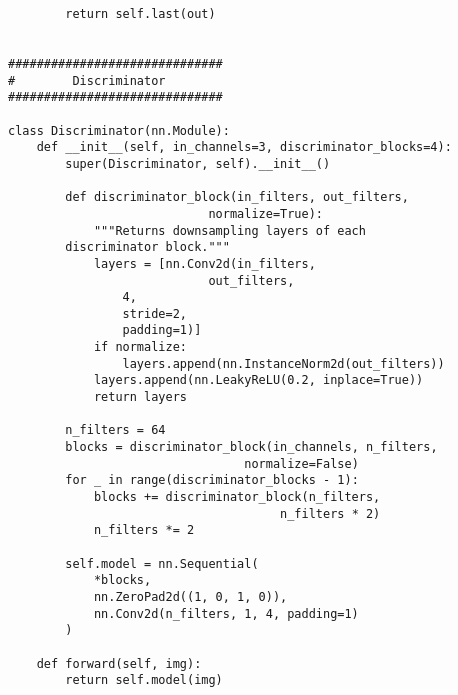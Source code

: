 \documentclass[../main.tex]{subfiles}
\begin{document}
\begin{lstlisting}
        return self.last(out)


##############################
#        Discriminator
##############################

class Discriminator(nn.Module):
    def __init__(self, in_channels=3, discriminator_blocks=4):
        super(Discriminator, self).__init__()

        def discriminator_block(in_filters, out_filters,
	                        normalize=True):
            """Returns downsampling layers of each
	    discriminator block."""
            layers = [nn.Conv2d(in_filters,
	                        out_filters,
				4,
				stride=2,
				padding=1)]
            if normalize:
                layers.append(nn.InstanceNorm2d(out_filters))
            layers.append(nn.LeakyReLU(0.2, inplace=True))
            return layers

        n_filters = 64
        blocks = discriminator_block(in_channels, n_filters,
	                             normalize=False)
        for _ in range(discriminator_blocks - 1):
            blocks += discriminator_block(n_filters,
	                                  n_filters * 2)
            n_filters *= 2

        self.model = nn.Sequential(
            *blocks,
            nn.ZeroPad2d((1, 0, 1, 0)),
            nn.Conv2d(n_filters, 1, 4, padding=1)
        )

    def forward(self, img):
        return self.model(img)

\end{lstlisting}
\end{document}
